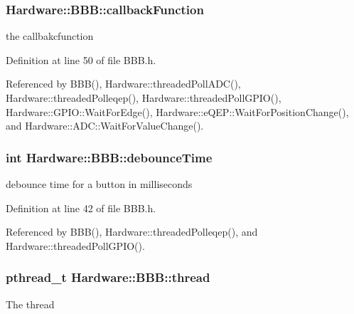 \subsubsection[{callback\+Function}]{ Hardware\+::\+B\+B\+B\+::callback\+Function\hspace{0.3cm}{\ttfamily [protected]}}\label{class_hardware_1_1_b_b_b_a66d583952f3949a732ee15eea81e80e5}
the callbakcfunction 

Definition at line 50 of file B\+B\+B.\+h.



Referenced by B\+B\+B(), Hardware\+::threaded\+Poll\+A\+D\+C(), Hardware\+::threaded\+Polleqep(), Hardware\+::threaded\+Poll\+G\+P\+I\+O(), Hardware\+::\+G\+P\+I\+O\+::\+Wait\+For\+Edge(), Hardware\+::e\+Q\+E\+P\+::\+Wait\+For\+Position\+Change(), and Hardware\+::\+A\+D\+C\+::\+Wait\+For\+Value\+Change().

\hypertarget{class_hardware_1_1_b_b_b_a353a2d7d4fbade337e5173b484b20b22}{}
\subsubsection[{debounce\+Time}]{\setlength{\rightskip}{0pt plus 5cm}int Hardware\+::\+B\+B\+B\+::debounce\+Time}\label{class_hardware_1_1_b_b_b_a353a2d7d4fbade337e5173b484b20b22}
debounce time for a button in milliseconds 

Definition at line 42 of file B\+B\+B.\+h.



Referenced by B\+B\+B(), Hardware\+::threaded\+Polleqep(), and Hardware\+::threaded\+Poll\+G\+P\+I\+O().

\hypertarget{class_hardware_1_1_b_b_b_a3ad3fe886705bfc242ef58dc5329166e}{}
\subsubsection[{thread}]{\setlength{\rightskip}{0pt plus 5cm}pthread\+\_\+t Hardware\+::\+B\+B\+B\+::thread\hspace{0.3cm}{\ttfamily [protected]}}\label{class_hardware_1_1_b_b_b_a3ad3fe886705bfc242ef58dc5329166e}
The thread 


